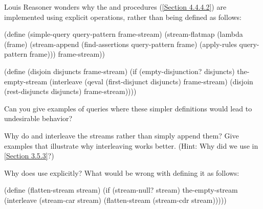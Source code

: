 \begin{exercise}
	\label{Exercise 4.71}
	Louis Reasoner wonders why the  and  procedures (\cref{Section 4.4.4.2}) are implemented using explicit  operations, rather than being defined as follows:
	\begin{scheme}
	  (define (simple-query query-pattern frame-stream)
	    (stream-flatmap
	     (lambda (frame)
	       (stream-append
	        (find-assertions query-pattern frame)
	        (apply-rules query-pattern frame)))
	     frame-stream))

	  (define (disjoin disjuncts frame-stream)
	    (if (empty-disjunction? disjuncts)
	        the-empty-stream
	        (interleave
	         (qeval (first-disjunct disjuncts)
	                frame-stream)
	         (disjoin (rest-disjuncts disjuncts)
	                  frame-stream))))
	\end{scheme}
	Can you give examples of queries where these simpler definitions would lead to
	undesirable behavior?
\end{exercise}



\begin{exercise}
	\label{Exercise 4.72}
	Why do  and  interleave the streams rather than simply append them?
	Give examples that illustrate why interleaving works better.
	(Hint: Why did we use  in \cref{Section 3.5.3}?)
\end{exercise}

\begin{exercise}
	\label{Exercise 4.73}
	Why does 
	use  explicitly?  What would be wrong with defining it as follows:
	\begin{scheme}
	  (define (flatten-stream stream)
	    (if (stream-null? stream)
	        the-empty-stream
	        (interleave
	         (stream-car stream)
	         (flatten-stream (stream-cdr stream)))))
	\end{scheme}
\end{exercise}



